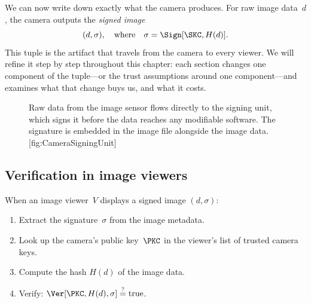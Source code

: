 We can now write down exactly what the camera produces.
For raw image data~\(d\), the camera outputs the \emph{signed image}
\[
  (d, \sigma),
  \quad\text{where}\quad
  \sigma = \Sign[\SKC, H(d)].
\]
This tuple is the artifact that travels from the camera to every viewer.
We will refine it step by step throughout this chapter: each section
changes one component of the tuple---or the trust assumptions around one
component---and examines what that change buys us, and what it costs.

\begin{figure}
  \begin{sidecaption}{%
    Raw data from the image sensor flows directly to the signing unit,
    which signs it before the data reaches any modifiable software.
    The signature is embedded in the image file alongside the image data.
  }[fig:CameraSigningUnit]
  \centering
  \end{sidecaption}
\end{figure}

\subsection{Verification in image viewers}\label{CameraVerification}

When an image viewer~\(V\) displays a signed image \((d, \sigma)\):
\begin{enumerate}
  \item Extract the signature~\(\sigma\) from the image metadata.
  \item Look up the camera's public key~\(\PKC\) in the viewer's list of
    trusted camera keys.
  \item Compute the hash \(H(d)\) of the image data.
  \item Verify: \(\Ver[\PKC, H(d), \sigma] \stackrel{?}{=}
    \text{true}\).
\end{enumerate}

